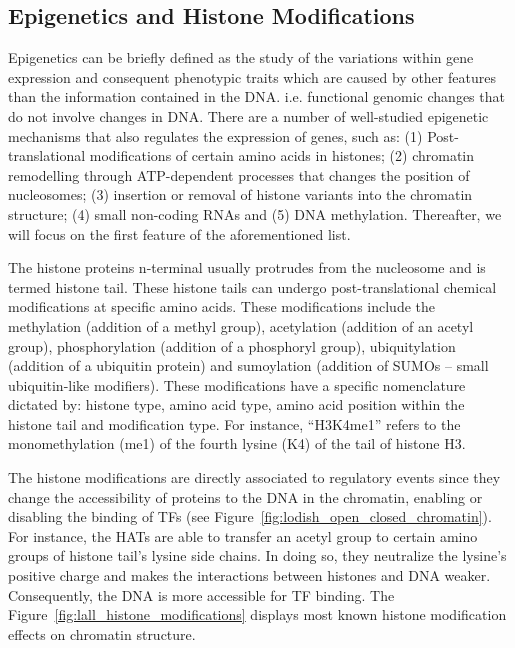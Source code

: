 \subsection{Epigenetics and Histone Modifications}
\label{sec:epigenetics.histone.modifications}

Epigenetics can be briefly defined as the study of the variations within gene expression and consequent phenotypic traits which are caused by other features than the information contained in the DNA. i.e. functional genomic changes that do not involve changes in DNA. There are a number of well-studied epigenetic mechanisms that also regulates the expression of genes, such as: (1) Post-translational modifications of certain amino acids in histones; (2) chromatin remodelling through ATP-dependent processes that changes the position of nucleosomes; (3) insertion or removal of histone variants into the chromatin structure; (4) small non-coding RNAs and (5) DNA methylation. Thereafter, we will focus on the first feature of the aforementioned list.

The histone proteins n-terminal usually protrudes from the nucleosome and is termed histone tail. These histone tails can undergo post-translational chemical modifications at specific amino acids. These modifications include the methylation (addition of a methyl group), acetylation (addition of an acetyl group), phosphorylation (addition of a phosphoryl group), ubiquitylation (addition of a ubiquitin protein) and sumoylation (addition of SUMOs -- small ubiquitin-like modifiers). These modifications have a specific nomenclature dictated by: histone type, amino acid type, amino acid position within the histone tail and modification type. For instance, ``H3K4me1'' refers to the monomethylation (me1) of the fourth lysine (K4) of the tail of histone H3.

The histone modifications are directly associated to regulatory events since they change the accessibility of proteins to the DNA in the chromatin, enabling or disabling the binding of TFs (see Figure~\ref{fig:lodish_open_closed_chromatin}). For instance, the HATs are able to transfer an acetyl group to certain amino groups of histone tail's lysine side chains. In doing so, they neutralize the lysine's positive charge and makes the interactions between histones and DNA weaker. Consequently, the DNA is more accessible for TF binding. The Figure~\ref{fig:lall_histone_modifications} displays most known histone modification effects on chromatin structure.

